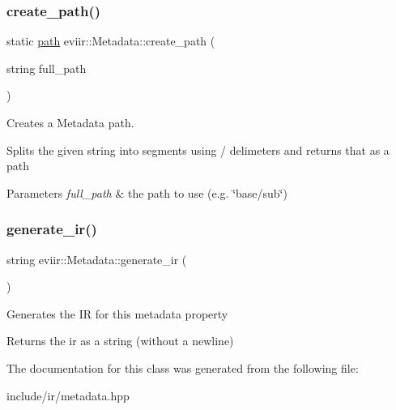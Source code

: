 \subsubsection{\texorpdfstring{create\+\_\+path()}{create\_path()}}
{\footnotesize\ttfamily static \hyperlink{classeviir_1_1Metadata_ac613e5de0552301f9b7969d14eb5dffa}{path} eviir\+::\+Metadata\+::create\+\_\+path (\begin{DoxyParamCaption}\item[{string}]{full\+\_\+path }\end{DoxyParamCaption})\hspace{0.3cm}{\ttfamily [static]}}



Creates a Metadata path. 

Splits the given string into segments using {\ttfamily /} delimeters and returns that as a path 
\begin{DoxyParams}{Parameters}
{\em full\+\_\+path} & the path to use (e.\+g. \char`\"{}base/sub\char`\"{}) \\
\hline
\end{DoxyParams}
\mbox{\label{classeviir_1_1Metadata_ab4ac3feef2692e4ae984842224787934}} 
\subsubsection{\texorpdfstring{generate\+\_\+ir()}{generate\_ir()}}
{\footnotesize\ttfamily string eviir\+::\+Metadata\+::generate\+\_\+ir (\begin{DoxyParamCaption}{ }\end{DoxyParamCaption})}

Generates the IR for this metadata property \begin{DoxyReturn}{Returns}
the ir as a string (without a newline) 
\end{DoxyReturn}


The documentation for this class was generated from the following file\+:\begin{DoxyCompactItemize}
\item 
include/ir/metadata.\+hpp\end{DoxyCompactItemize}
